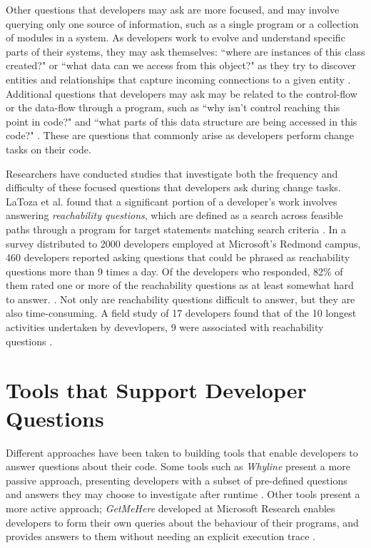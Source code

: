\par Other questions that developers may ask are more focused, and may involve
querying only one source of information, such as a single program or a
collection of modules in a system.
As developers work to evolve and understand specific parts of their systems,
they may ask themselves: ``where are instances of this class created?" or
``what data can we access from this object?" as they try to discover entities
and relationships that capture incoming connections to a given entity
\cite{sillito-2006-questions-during-task}.
Additional questions that developers may ask may be related to 
the control-flow or the data-flow through a program, such as 
``why isn't control reaching this point in code?" and 
``what parts of this data structure are being accessed in this code?" 
\cite{sillito-2006-questions-during-task}.
These are questions that commonly arise as developers perform change tasks
on their code.

\par Researchers have conducted studies that investigate both the 
frequency and difficulty of these focused questions that developers ask during 
change tasks.
LaToza et al. found that a significant portion of a developer's work involves 
answering \emph{reachability questions}, which are defined as a search across 
feasible paths through a program for target statements matching search criteria 
\cite{latoza-2010-reach}.
In a survey distributed to 2000 developers employed at Microsoft's Redmond
campus, 460 developers reported asking questions that could be phrased as 
reachability questions more than 9 times a day.
Of the developers who responded, 82\% of them rated one or more of the
reachability questions as at least somewhat hard to answer.
\cite{latoza-2010-reach}.
Not only are reachability questions difficult to answer, but they are also
time-consuming.
A field study of 17 developers found that of the 10 longest activities
undertaken by devevlopers, 9 were associated with reachability questions
\cite{latoza-2010-reach}.


\section{Tools that Support Developer Questions}
\label{sec:ToolsSupportDeveloperQuestions}

\noindent Different approaches have been taken to building tools 
that enable developers to answer questions about their code.
Some tools such as \emph{Whyline} present a more passive approach,
presenting developers with a subset of pre-defined questions and answers 
they may choose to investigate after runtime \cite{ko-2004-whyline}.
Other tools present a more active approach; \emph{GetMeHere} developed
at Microsoft Research enables developers to form their own queries about
the behaviour of their programs, and provides answers to them without needing
an explicit execution trace \cite{barnett-2014-get}.

